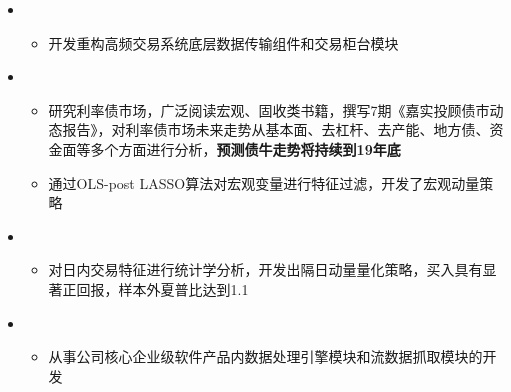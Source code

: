   \begin{itemize}[leftmargin=*]
    \item
      {\small
      \begin{itemize}
        \item 开发重构高频交易系统底层数据传输组件和交易柜台模块
      \end{itemize}
      }
    \item
      {\small
      \begin{itemize}
        \item 研究利率债市场，广泛阅读宏观、固收类书籍，撰写7期《嘉实投顾债市动态报告》，对利率债市场未来走势从基本面、去杠杆、去产能、地方债、资金面等多个方面进行分析，\textbf{预测债牛走势将持续到19年底}
        \item 通过OLS-post LASSO算法对宏观变量进行特征过滤，开发了宏观动量策略
      \end{itemize}
      }
    \item
      {\small
      \begin{itemize}
        \item 对日内交易特征进行统计学分析，开发出隔日动量量化策略，买入具有显著正回报，样本外夏普比达到1.1
      \end{itemize}
      }
    \item
      {\small
      \begin{itemize}
        \item 从事公司核心企业级软件产品内数据处理引擎模块和流数据抓取模块的开发
      \end{itemize}
      }
  \end{itemize}